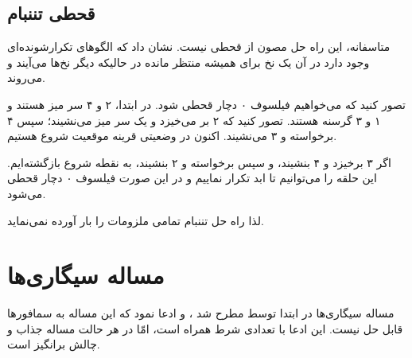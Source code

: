 \documentclass{book}
\newcommand{\clearemptydoublepage}{\newpage\cleardoublepage}
\begin{document}
\clearemptydoublepage
\subsection{قحطی تننبام}

    متاسفانه، این راه حل مصون از قحطی نیست.  نشان داد که الگوهای تکرارشونده‌ای وجود دارد در آن یک نخ برای همیشه منتظر مانده در 
    حالیکه دیگر نخ‌ها می‌آیند و می‌روند\cite{gingras90dining}.

    تصور کنید که می‌خواهیم فیلسوف ۰ دچار قحطی شود. در ابتدا، ۲ و ۴ سر میز هستند و ۱ و ۳ گرسنه هستند. تصور کنید که ۲ بر می‌خیزد و یک سر میز می‌نشیند؛ 
    سپس ۴ برخواسته و ۳ می‌نشیند. اکنون در وضعیتی قرینه موقعیت شروع هستیم. 

    اگر ۳ برخیزد و ۴ بنشیند، و سپس  برخواسته و ۲ بنشیند، به نقطه شروع بازگشته‌ایم. 
    این  حلقه را می‌توانیم تا ابد تکرار نماییم و در این صورت فیلسوف ۰ دچار قحطی می‌شود. 

    لذا راه حل تننبام تمامی ملزومات را بار آورده نمی‌نماید. 


\clearemptydoublepage
\section {مساله سیگاری‌ها}

    مساله سیگاری‌ها در ابتدا توسط      مطرح شد \cite{patil}، و ادعا نمود که  این مساله به سمافورها قابل حل نیست. 
    این ادعا با تعدادی شرط همراه است، امّا در هر حالت مساله جذاب و چالش برانگیز است. 
\end{document}
